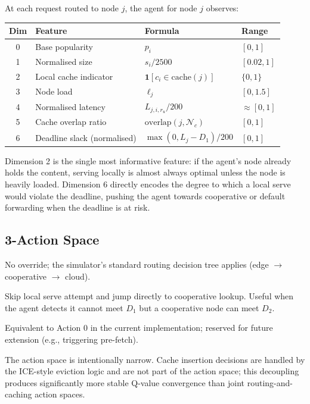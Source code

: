 \documentclass[12pt]{article}
\begin{document}
At each request routed to node $j$, the agent for node $j$ observes:

\begin{tabularx}{\linewidth}{@{}c l l X@{}}
\toprule
\textbf{Dim} & \textbf{Feature} & \textbf{Formula} & \textbf{Range} \\
\midrule
0 & Base popularity & $p_i$ & $[0, 1]$ \\
1 & Normalised size & $s_i / 2500$ & $[0.02, 1]$ \\
2 & Local cache indicator & $\mathbf{1}[c_i \in \text{cache}(j)]$ & $\{0, 1\}$ \\
3 & Node load & $\ell_j$ & $[0, 1.5]$ \\
4 & Normalised latency & $L_{j,i,r_u} / 200$ & $\approx[0,1]$ \\
5 & Cache overlap ratio & $\text{overlap}(j, \mathcal{N}_c)$ & $[0, 1]$ \\
6 & Deadline slack (normalised) & $\max(0, L_j - D_1) / 200$ & $[0, 1]$ \\
\bottomrule
\end{tabularx}

Dimension 2 is the single most informative feature: if the agent's node already holds the content, serving locally is almost always optimal unless the node is heavily loaded. Dimension 6 directly encodes the degree to which a local serve would violate the deadline, pushing the agent towards cooperative or default forwarding when the deadline is at risk.

\subsection{3-Action Space}
\label{sec:actions}

\begin{description}[noitemsep]
  \item[Action 0 -- SERVE\_LOCAL (default)] No override; the simulator's standard routing decision tree applies (edge $\to$ cooperative $\to$ cloud).
  \item[Action 1 -- FORWARD\_DCCC] Skip local serve attempt and jump directly to cooperative lookup. Useful when the agent detects it cannot meet $D_1$ but a cooperative node can meet $D_2$.
  \item[Action 2 -- DEFAULT\_POLICY] Equivalent to Action 0 in the current implementation; reserved for future extension (e.g., triggering pre-fetch).
\end{description}

The action space is intentionally narrow. Cache insertion decisions are handled by the ICE-style eviction logic and are not part of the action space; this decoupling produces significantly more stable Q-value convergence than joint routing-and-caching action spaces.
\end{document}
